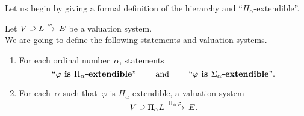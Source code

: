 \documentclass[main.tex]{subfiles}
\begin{document}
Let us begin by giving a formal definition
of the hierarchy
and ``$\Pi_\alpha$-extendible''.
\begin{dfn}
\label{P:hier}
Let $V \supseteq L\,\smash{\xrightarrow{\varphi}\,E}$
be a valuation system.\\
We are going to define the following
statements and valuation systems.
\begin{enumerate}
\item \label{hier:first-cond}
For each ordinal number~$\alpha$,
statements
\begin{equation*}
\text{``\textbf{$\varphi$ is $\Pi_\alpha$-extendible}''}
\qquad\text{ and }\qquad
\text{``\textbf{$\varphi$ is $\Sigma_\alpha$-extendible}''}.
\end{equation*}
\item
For each~$\alpha$ such that~$\varphi$ 
is $\Pi_\alpha$-extendible,
a valuation system 
\begin{equation*}
V \supseteq \Pi_\alpha L\,\smash{\xrightarrow{\Pi_\alpha \varphi}\,E}.
\end{equation*}


\end{enumerate}
\end{dfn}
\end{document}
